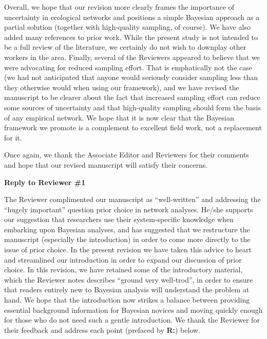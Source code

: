 \documentclass[12pt]{letter}
\begin{document}
	Overall, we hope that our revision more clearly frames the importance of uncertainty in ecological networks and positions a simple Bayesian approach as a partial solution (together with high-quality sampling, of course). 
	We have also added many references to prior work. While the present study is not intended to be a full review of the literature, we certainly do not wish to downplay other workers in the area.
	Finally, several of the Reviewers appeared to believe that we were advocating for reduced sampling effort. That is emphatically not the case (we had not anticipated that anyone would seriously consider sampling less than they otherwise would when using our framework), and we have revised the manuscript to be clearer about the fact that increased sampling effort can reduce some sources of uncertainty and that high-quality sampling should form the basis of any empirical network. We hope that it is now clear that the Bayesian framework we promote is a complement to excellent field work, not a replacement for it.


	Once again, we thank the Associate Editor and Reviewers for their comments and hope that our revised manuscript will satisfy their concerns.

\newpage


{\Large \bf Reply to Reviewer \#1}


	The Reviewer complimented our manuscript as ``well-written'' and addressing the ``hugely important'' question prior choice in network analyses. He/she supports our suggestion that researchers use their system-specific knowledge when embarking upon Bayesian analyses, and has suggested that we restructure the manuscript (especially the introduction) in order to come more directly to the issue of prior choice. In the present revision we have taken this advice to heart and streamlined our introduction in order to expand our discussion of prior choice. In this revision, we have retained some of the introductory material, which the Reviewer notes describes ``ground very well-trod'', in order to ensure that readers entirely new to Bayesian analysis will understand the problem at hand. We hope that the introduction now strikes a balance between providing essential background information for Bayesian novices and moving quickly enough for those who do not need such a gentle introduction. We thank the Reviewer for their feedback and address each point (prefaced by \textbf{R:}) below.
\end{document}
